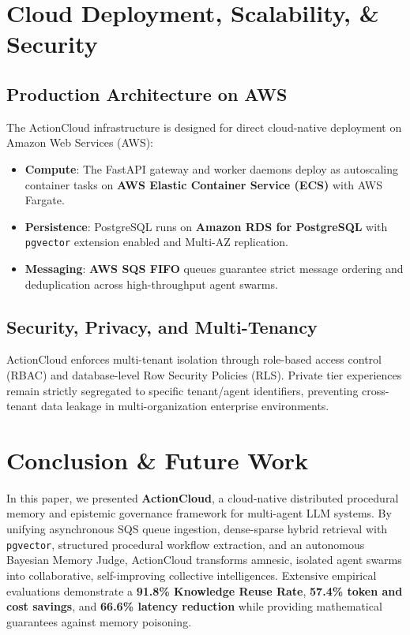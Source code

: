 \documentclass[lettersize,journal]{IEEEtran}
\begin{document}
\section{Cloud Deployment, Scalability, \& Security}

\subsection{Production Architecture on AWS}
The ActionCloud infrastructure is designed for direct cloud-native deployment on Amazon Web Services (AWS):
\begin{itemize}
    \item \textbf{Compute}: The FastAPI gateway and worker daemons deploy as autoscaling container tasks on \textbf{AWS Elastic Container Service (ECS)} with AWS Fargate.
    \item \textbf{Persistence}: PostgreSQL runs on \textbf{Amazon RDS for PostgreSQL} with \texttt{pgvector} extension enabled and Multi-AZ replication.
    \item \textbf{Messaging}: \textbf{AWS SQS FIFO} queues guarantee strict message ordering and deduplication across high-throughput agent swarms.
\end{itemize}

\subsection{Security, Privacy, and Multi-Tenancy}
ActionCloud enforces multi-tenant isolation through role-based access control (RBAC) and database-level Row Security Policies (RLS). Private tier experiences remain strictly segregated to specific tenant/agent identifiers, preventing cross-tenant data leakage in multi-organization enterprise environments.

\section{Conclusion \& Future Work}
In this paper, we presented \textbf{ActionCloud}, a cloud-native distributed procedural memory and epistemic governance framework for multi-agent LLM systems. By unifying asynchronous SQS queue ingestion, dense-sparse hybrid retrieval with \texttt{pgvector}, structured procedural workflow extraction, and an autonomous Bayesian Memory Judge, ActionCloud transforms amnesic, isolated agent swarms into collaborative, self-improving collective intelligences. Extensive empirical evaluations demonstrate a \textbf{91.8\% Knowledge Reuse Rate}, \textbf{57.4\% token and cost savings}, and \textbf{66.6\% latency reduction} while providing mathematical guarantees against memory poisoning.
\end{document}
